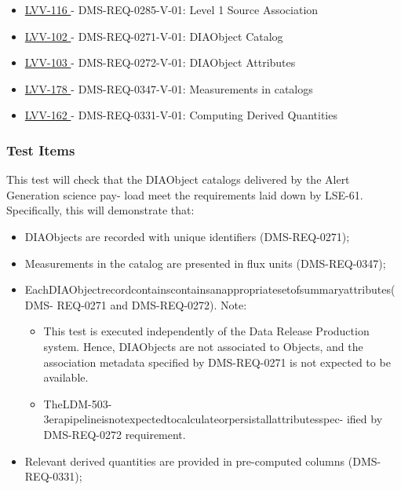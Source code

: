 \begin{itemize}

\item \href{https://jira.lsstcorp.org/browse/LVV-116}{ LVV-116 } - DMS-REQ-0285-V-01: Level 1 Source Association

\item \href{https://jira.lsstcorp.org/browse/LVV-102}{ LVV-102 } - DMS-REQ-0271-V-01: DIAObject Catalog

\item \href{https://jira.lsstcorp.org/browse/LVV-103}{ LVV-103 } - DMS-REQ-0272-V-01: DIAObject Attributes

\item \href{https://jira.lsstcorp.org/browse/LVV-178}{ LVV-178 } - DMS-REQ-0347-V-01: Measurements in catalogs

\item \href{https://jira.lsstcorp.org/browse/LVV-162}{ LVV-162 } - DMS-REQ-0331-V-01: Computing Derived Quantities

\end{itemize}


\subsubsection{Test Items}

This test will check that the DIAObject catalogs delivered by the Alert
Generation science pay- load meet the requirements laid down by
LSE-61.\\
Specifically, this will demonstrate that:

\begin{itemize}
\tightlist
\item
  DIAObjects are recorded with unique identifiers (DMS-REQ-0271);
\item
  Measurements in the catalog are presented in flux units
  (DMS-REQ-0347);
\item
  EachDIAObjectrecordcontainscontainsanappropriatesetofsummaryattributes(DMS-
  REQ-0271 and DMS-REQ-0272). Note:

  \begin{itemize}
  \tightlist
  \item
    This test is executed independently of the Data Release Production
    system. Hence, DIAObjects are not associated to Objects, and the
    association metadata specified by DMS-REQ-0271 is not expected to be
    available.
  \item
    TheLDM-503-3erapipelineisnotexpectedtocalculateorpersistallattributesspec-
    ified by DMS-REQ-0272 requirement.
  \end{itemize}
\item
  Relevant derived quantities are provided in pre-computed columns
  (DMS-REQ-0331);~
\end{itemize}

